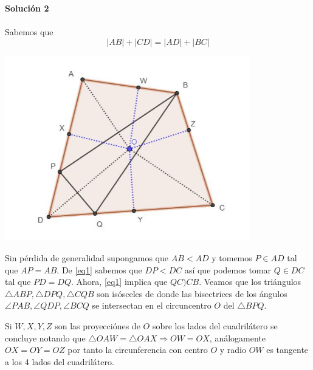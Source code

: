 \noindent\textbf{Solución 2}\\\\

Sabemos que 
\begin{equation}
\label{eq1}
|AB| + |CD| = |AD| + |BC|
\end{equation}

\begin{center}
	\includegraphics[width=0.8\textwidth]{img/51M04_shg00100019.1.png}
\end{center}

Sin pérdida de generalidad supongamos que $AB < AD$ y tomemos $P\in AD$ tal que $AP = AB$. De \eqref{eq1} sabemos que $DP < DC$ así que podemos tomar $Q\in DC$ tal que $PD =DQ$. Ahora, \eqref{eq1} implica que $QC ) CB$. Veamos que los triángulos $\triangle  ABP, \triangle DPQ, \triangle CQB$ son isósceles de donde las bisectrices de los ángulos $\angle  PAB, \angle QDP, \angle BCQ$ se intersectan en el circuncentro $O$ del $\triangle BPQ$.

Si $W,X,Y,Z$ son las proyecciónes de $O$ sobre los lados del cuadrilátero se concluye notando que $\triangle OAW = \triangle OAX \Rightarrow OW = OX$, análogamente $OX = OY = OZ$ por tanto la circunferencia con centro $O$ y radio $OW$ es tangente a los 4 lados del cuadrilátero.